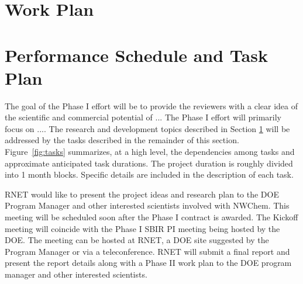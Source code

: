 \section{Work Plan} 
\label{sec:approach}



\section{Performance Schedule and Task Plan}
\label{sec:taskplan}

The goal of the Phase I effort will be to provide the reviewers with a clear idea 
of the scientific and commercial potential of ... The Phase I effort will primarily focus on .... The research and development topics described in Section \ref{sec:approach} 
will be addressed by the tasks described in the remainder of this section. 
Figure~\ref{fig:tasks} summarizes, at a high level, the dependencies among tasks 
and approximate anticipated task durations. The project duration is roughly 
divided into 1 month blocks. Specific details are included in the description 
of each task. 

RNET would like to present the project ideas and research plan to the DOE 
Program Manager and other interested scientists involved with NWChem.
This meeting will 
be scheduled soon after the Phase I contract is awarded. The Kickoff meeting 
will coincide with the Phase I SBIR PI meeting being hosted by the DOE. The 
meeting can be hosted at RNET, a DOE site suggested by the Program Manager or 
via a teleconference. RNET will submit a final report and present the report 
details along with a Phase II work plan to the DOE program manager and other 
interested scientists.

